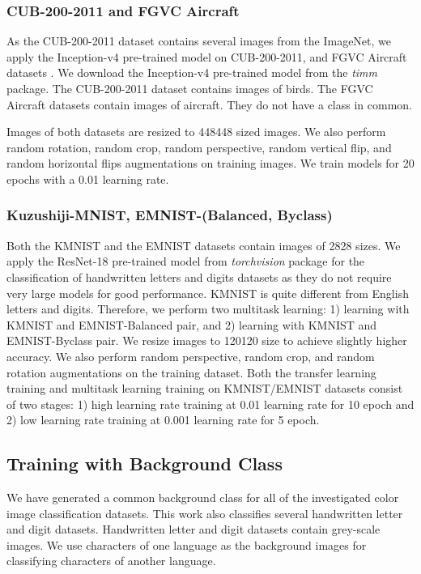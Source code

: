 \documentclass{article}
\begin{document}
\subsubsection{CUB-200-2011 and FGVC Aircraft}
As the CUB-200-2011 dataset \cite{wah2011caltech} contains several images from the ImageNet, we apply the Inception-v4 pre-trained model on CUB-200-2011, and  FGVC Aircraft datasets \cite{maji2013fine}. We download the Inception-v4 pre-trained model from the \emph{timm} package. The CUB-200-2011 dataset contains images of birds. The FGVC Aircraft datasets contain images of aircraft.  They do not have a class in common.

Images of both datasets are resized to 448448 sized images. We also perform random rotation, random crop, random perspective, random vertical flip, and random horizontal flips augmentations on training images. We train models for 20 epochs with a 0.01 learning rate.

\subsubsection{Kuzushiji-MNIST, EMNIST-(Balanced, Byclass)}
Both the KMNIST \cite{clanuwat2018deep} and the EMNIST \cite{cohen2017emnist} datasets contain images of 2828 sizes.
We apply the ResNet-18 pre-trained model from \emph{torchvision} package for the classification of handwritten letters and digits datasets as they do not require very large models for good performance. KMNIST is quite different from English letters and digits. Therefore, we perform two multitask learning: 1) learning with KMNIST and EMNIST-Balanced pair, and 2) learning with KMNIST and EMNIST-Byclass pair. We resize images to 120120 size to achieve slightly higher accuracy. We also perform random perspective, random crop, and random rotation augmentations on the training dataset. Both the transfer learning training and multitask learning training on KMNIST/EMNIST datasets consist of two stages: 1) high learning rate training at 0.01 learning rate for 10 epoch and 2) low learning rate training at 0.001 learning rate for 5 epoch.






\subsection{Training with Background Class}
We have generated a common background class for all of the investigated color image classification datasets. This work also classifies several handwritten letter and digit datasets. Handwritten letter and digit datasets contain grey-scale images. We use characters of one language as the background images for classifying characters of another language.
\end{document}
